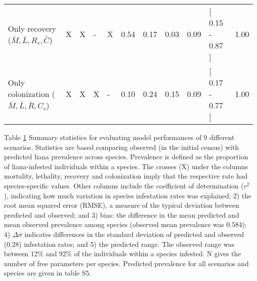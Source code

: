 \documentclass[b5paper,justified]{tufte-book} %
\begin{document}
\begin{fullwidth}
\begin{landscape}
\begin{table}
\begin{center}
\begin{tabular}{lllllrrrrlr}
  Only recovery ($ \bar{M},\bar{L},R_s,\bar{C} $) & X & X & - & X & 0.54 & 0.17 & 0.03 & 0.09 & [ 0.15 - 0.87 ] & 1.00 \\ 
  Only colonization ($ \bar{M},\bar{L},\bar{R},C_s $) & X & X & X & - & 0.10 & 0.24 & 0.15 & 0.09 & [ 0.17 - 0.77 ] & 1.00 \\ 
   \hline
\end{tabular}
\label{tab:chap8tab1}
\hspace*{4cm} \begin{minipage}{20cm}
\footnotesize Table \ref{tab:chap8tab1} 
Summary statistics for evaluating model performances of 9 different scenarios. Statistics are based comparing observed (in the initial census) with predicted liana prevalence across species. Prevalence is defined as the proportion of liana-infested individuals within a species. The crosses (X) under the columns mortality, lethality, recovery and colonization imply that the respective rate had species-specific values. Other columns include the coefficient of determination ($r^2$), indicating how much variation in species infestation rates was explained; 2) the root mean squared error (RMSE), a measure of the typical deviation between predicted and observed; and 3) bias: the difference in the mean predicted and mean observed prevalence among species (observed mean prevalence was 0.584); 4) $\Delta\sigma$ indicates differences in the standard deviation of predicted and observed (0.28) infestation rates; and 5) the predicted range. The observed range was between 12\% and 92\% of the individuals within a species infested. N gives the number of free parameters per species. Predicted prevalence for all scenarios and species are given in table S5.
\end{minipage}
\end{center}
\end{table}
\end{landscape}



\end{fullwidth}
\end{document}

